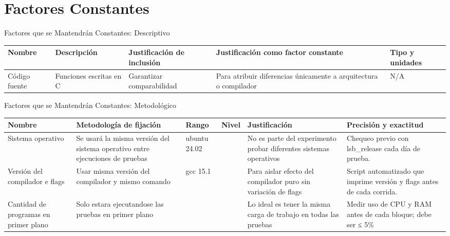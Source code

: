 \documentclass[aspectratio=169]{beamer}
\begin{document}
\section{Factores Constantes}

\begin{frame}{Factores que se Mantendrán Constantes: Descriptivo}
    \begin{table}
        \begin{tabularx}{\textwidth}{|>{\raggedright\arraybackslash}p{2cm}|>{\raggedright\arraybackslash}X|>{\raggedright\arraybackslash}X|>{\raggedright\arraybackslash}X|>{\raggedright\arraybackslash}p{2cm}|}
            \hline
            \textbf{Nombre} & \textbf{Descripción} & \textbf{Justificación de inclusión} & \textbf{Justificación como factor constante} & \textbf{Tipo y unidades} \\
            \hline
            Código fuente & Funciones escritas en C & Garantizar comparabilidad & Para atribuir diferencias únicamente a arquitectura o compilador & N/A \\
            \hline
        \end{tabularx}
    \end{table}
\end{frame}

\begin{frame}{Factores que se Mantendrán Constantes: Metodológico}
    \small
    \begin{table}
        \begin{tabularx}{\textwidth}{|>{\raggedright\arraybackslash}p{2cm}|>{\raggedright\arraybackslash}X|>{\raggedright\arraybackslash}p{1.5cm}|>{\raggedright\arraybackslash}p{1cm}|>{\raggedright\arraybackslash}X|>{\raggedright\arraybackslash}X|}
            \hline
            \textbf{Nombre} & \textbf{Metodología de fijación} & \textbf{Rango} & \textbf{Nivel} & \textbf{Justificación} & \textbf{Precisión y exactitud} \\
            \hline
            Sistema operativo & Se usará la misma versión del sistema operativo entre ejecuciones de pruebas & ubuntu 24.02 & 1 & No es parte del experimento probar diferentes sistemas operativos & Chequeo previo con lsb\_release cada día de prueba. \\
            \hline
            Versión del compilador e flags & Usar misma versión del compilador y mismo comando & gcc 15.1 & 1 & Para aislar efecto del compilador puro sin variación de flags & Script automatizado que imprime versión y flags antes de cada corrida. \\
            \hline
            Cantidad de programas en primer plano & Solo estara ejecutandose las pruebas en primer plano & 1 & 1 & Lo ideal es tener la misma carga de trabajo en todas las pruebas & Medir uso de CPU y RAM antes de cada bloque; debe ser ≤ 5\% \\
            \hline
        \end{tabularx}
    \end{table}
\end{frame}
\end{document}
